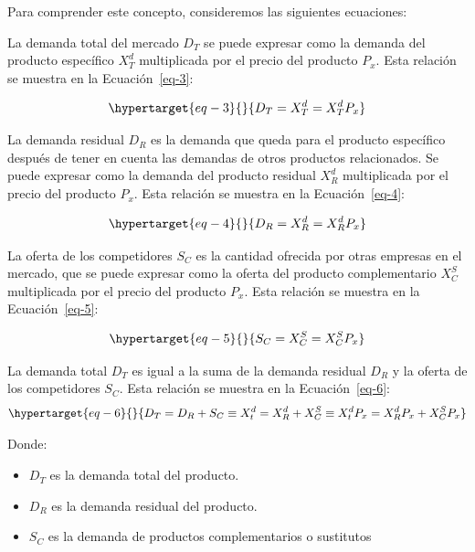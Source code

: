 \documentclass[
  letterpaper,
  DIV=11,
  numbers=noendperiod]{scrartcl}
\providecommand{\tightlist}{%
  \setlength{\itemsep}{0pt}\setlength{\parskip}{0pt}}\usepackage{longtable,booktabs,array}
\begin{document}
Para comprender este concepto, consideremos las siguientes ecuaciones:

La demanda total del mercado \(D_T\) se puede expresar como la demanda
del producto específico \(X_T^d\) multiplicada por el precio del
producto \(P_x\). Esta relación se muestra en la Ecuación~\ref{eq-3}:

\begin{equation}\protect\hypertarget{eq-3}{}{
D_T = X_{T}^{d} = X_{T}^{d} P_{x}
}\label{eq-3}\end{equation}

La demanda residual \(D_R\) es la demanda que queda para el producto
específico después de tener en cuenta las demandas de otros productos
relacionados. Se puede expresar como la demanda del producto residual
\(X_R^d\) multiplicada por el precio del producto \(P_x\). Esta relación
se muestra en la Ecuación~\ref{eq-4}:

\begin{equation}\protect\hypertarget{eq-4}{}{
D_R = X_R^d = X_R^d P_x
}\label{eq-4}\end{equation}

La oferta de los competidores \(S_C\) es la cantidad ofrecida por otras
empresas en el mercado, que se puede expresar como la oferta del
producto complementario \(X_C^S\) multiplicada por el precio del
producto \(P_x\). Esta relación se muestra en la Ecuación~\ref{eq-5}:

\begin{equation}\protect\hypertarget{eq-5}{}{
S_C = X_C^S = X_C^S P_x
}\label{eq-5}\end{equation}

La demanda total \(D_T\) es igual a la suma de la demanda residual
\(D_R\) y la oferta de los competidores \(S_C\). Esta relación se
muestra en la Ecuación~\ref{eq-6}:
\begin{equation}\protect\hypertarget{eq-6}{}{
D_T = D_R + S_C \equiv X_t^d = X_R^d + X_C^S \equiv X_t^d P_x = X_R^d P_x + X_C^S P_x
}\label{eq-6}\end{equation}

Donde:

\begin{itemize}
\tightlist
\item
  \(D_T\) es la demanda total del producto.
\item
  \(D_R\) es la demanda residual del producto.
\item
  \(S_C\) es la demanda de productos complementarios o sustitutos
\end{itemize}
\end{document}
